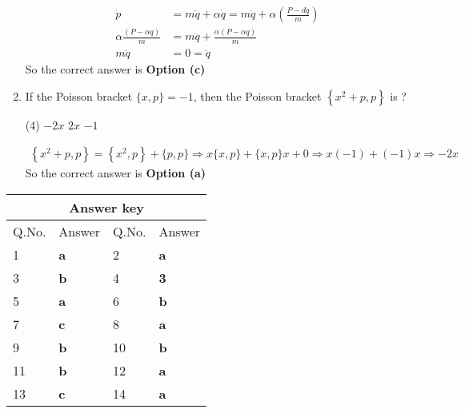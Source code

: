 \begin{enumerate}
\begin{answer}
\begin{align*}
	\dot{p}&=m \ddot{q}+\alpha \dot{q}=m \ddot{q}+\alpha\left(\frac{P-d q}{m}\right) \\
	\alpha \frac{(P-\alpha q)}{m}&=m \ddot{q}+\frac{\alpha(P-\alpha q)}{m} \\
	m \ddot{q}&=0=\ddot{q}
	\end{align*}
		So the correct answer is \textbf{Option (c)}
\end{answer}
	\item  If the Poisson bracket $\{x, p\}=-1$, then the Poisson bracket $\left\{x^{2}+p, p\right\}$ is ?
	{}
	\begin{tasks}(4)
		\task[\textbf{a.}] $-2 x$
		\task[\textbf{b.}]$2 x$
		\task[\textbf{d.}] $-1$
	\end{tasks}
\begin{answer}
	\begin{align*}
	\left\{x^{2}+p, p\right\}=\left\{x^{2}, p\right\}+\{p, p\} \Rightarrow x\{x, p\}+\{x, p\} x+0 \Rightarrow x(-1)+(-1) x \Rightarrow-2 x
	\end{align*}
	So the correct answer is \textbf{Option (a)}
\end{answer}
\end{enumerate}
\setlength\arrayrulewidth{1pt}
\begin{table}[H]
	\centering
	\begin{tabular}{|p{1.5cm}|p{1.5cm}||p{1.5cm}|p{1.5cm}|}
		\hline
		\multicolumn{4}{|c|}{\textbf{Answer key}}\\\hline\hline
		\rowcolor{ocrel}Q.No.&Answer&Q.No.&Answer\\\hline
		1&\textbf{a} &2&\textbf{a}\\\hline 
		3&\textbf{b} &4&\textbf{3} \\\hline
		5&\textbf{a} &6&\textbf{b} \\\hline
		7&\textbf{c}&8&\textbf{a}\\\hline
		9&\textbf{b}&10&\textbf{b}\\\hline
		11&\textbf{b} &12&\textbf{a}\\\hline
		13&\textbf{c}&14&\textbf{a}\\\hline
	\end{tabular}
\end{table}